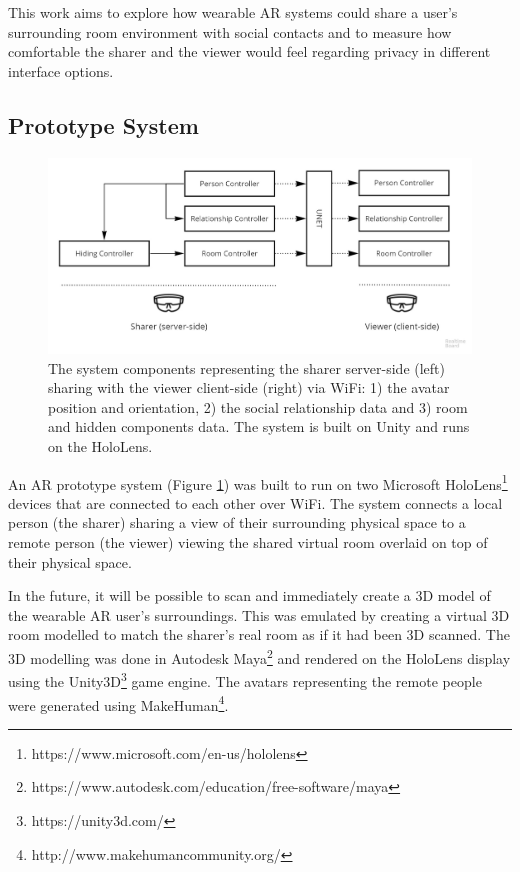 This work aims to explore how wearable AR systems could share a user's surrounding room environment with social contacts and to measure how comfortable the sharer and the viewer would feel regarding privacy in different interface options. 

\subsection{Prototype System}

\begin{figure}[H]
    \begin{center}
    \includegraphics[width=\linewidth]{images/frontier18/system.jpg}
    \caption{The system components representing the sharer server-side (left) sharing with the viewer client-side (right) via WiFi: 1) the avatar position and orientation, 2) the social relationship data and 3) room and hidden components data. The system is built on Unity and runs on the HoloLens.}\label{fig:frontier18:system}
    \end{center}
\end{figure}

An AR prototype system (Figure \ref{fig:frontier18:system}) was built to run on two Microsoft HoloLens\footnote{https://www.microsoft.com/en-us/hololens} devices that are connected to each other over WiFi. The system connects a local person (the sharer) sharing a view of their surrounding physical space to a remote person (the viewer) viewing the shared virtual room overlaid on top of their physical space.

In the future, it will be possible to scan and immediately create a 3D model of the wearable AR user's surroundings. This was emulated by creating a virtual 3D room modelled to match the sharer's real room as if it had been 3D scanned.  The 3D modelling was done in Autodesk Maya\footnote{https://www.autodesk.com/education/free-software/maya} and rendered on the HoloLens display using the Unity3D\footnote{https://unity3d.com/} game engine. The avatars representing the remote people were generated using MakeHuman\footnote{http://www.makehumancommunity.org/}.

